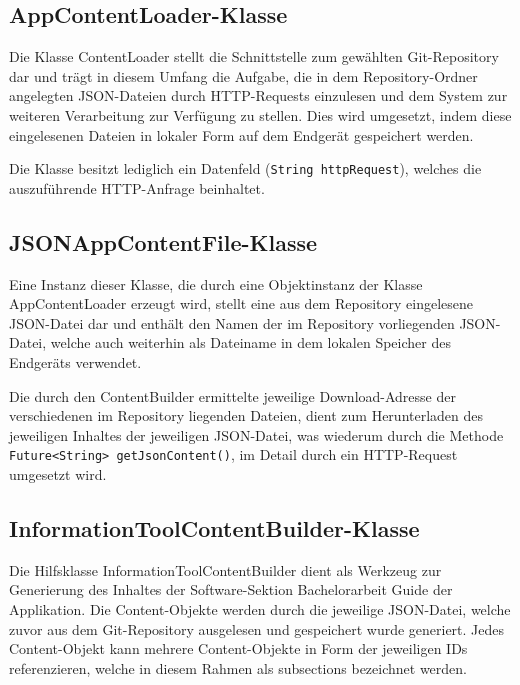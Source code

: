 \documentclass[bibliography=totoc,listof=totoc,BCOR=5mm,DIV=12,oneside]{scrbook}
\begin{document}
\newpage
\subsection{AppContentLoader-Klasse}
\par Die Klasse ContentLoader stellt die Schnittstelle zum gewählten Git-Repository dar und trägt in diesem Umfang die Aufgabe, die in dem Repository-Ordner angelegten JSON-Dateien durch HTTP-Requests  einzulesen und dem System zur weiteren Verarbeitung zur Verfügung zu stellen. Dies wird umgesetzt, indem diese eingelesenen Dateien in lokaler Form auf dem Endgerät gespeichert werden.
\par Die Klasse besitzt lediglich ein Datenfeld (\texttt{String httpRequest}), welches die auszuführende HTTP-Anfrage beinhaltet.

\subsection{JSONAppContentFile-Klasse}
\par Eine Instanz dieser Klasse, die durch eine Objektinstanz der Klasse AppContentLoader erzeugt wird, stellt eine aus dem Repository eingelesene JSON-Datei dar und enthält 
den Namen der im Repository vorliegenden JSON-Datei, welche auch weiterhin als Dateiname in dem lokalen Speicher des Endgeräts verwendet. 
\par Die durch den ContentBuilder ermittelte jeweilige Download-Adresse der verschiedenen im Repository liegenden Dateien, dient zum Herunterladen des jeweiligen Inhaltes der jeweiligen JSON-Datei, was wiederum durch die Methode \texttt{Future<String> getJsonContent()}, im Detail durch ein HTTP-Request umgesetzt wird.

\subsection{InformationToolContentBuilder-Klasse}
\par Die Hilfsklasse InformationToolContentBuilder dient als Werkzeug zur Generierung des Inhaltes der Software-Sektion \grqq Bachelorarbeit Guide\grqq{} der Applikation. Die Content-Objekte werden durch die jeweilige JSON-Datei, welche zuvor aus dem Git-Repository ausgelesen und gespeichert wurde generiert. Jedes Content-Objekt kann mehrere Content-Objekte in Form der jeweiligen IDs referenzieren, welche in diesem Rahmen als subsections bezeichnet werden.
\end{document}
